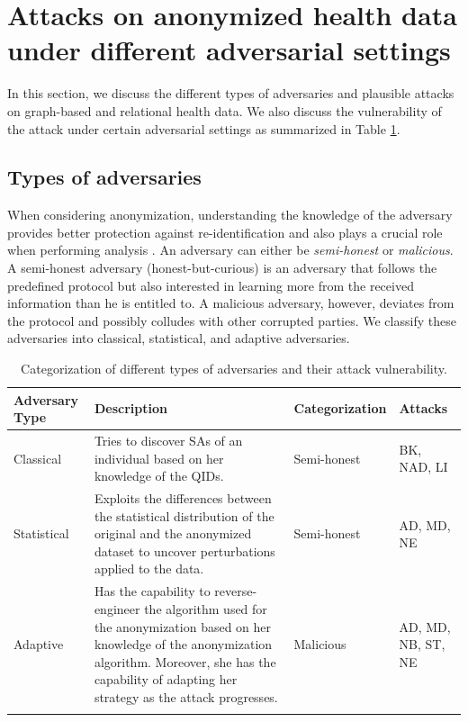\documentclass{bioinfo}
\begin{document}
\section{Attacks on anonymized health data under different adversarial settings}
\label{sec:diffattacks}
In this section, we discuss the different types of adversaries and plausible attacks on graph-based and relational health data. We also discuss the vulnerability of the attack under certain adversarial settings as summarized in Table \ref{advasaryclass}.

\subsection{Types of adversaries}
\label{sec:adversarytype}
When considering anonymization, understanding the knowledge of the adversary provides better protection against re-identification and also plays a crucial role when performing analysis \cite{cite730jandel2014decision}. An adversary can either be \textit{semi-honest} or \textit{malicious}. A semi-honest adversary (honest-but-curious) is an adversary that follows the predefined protocol but also interested in learning more from the received information than he is entitled to. A malicious adversary, however, deviates from the protocol and possibly colludes with other corrupted parties. We classify these adversaries into classical, statistical, and adaptive adversaries.


\begin{table}[h!]
\caption{Categorization of different types of adversaries and their attack vulnerability.}
\label{advasaryclass}
\begin{tabular}{p{1.2cm}p{3.1cm}p{1.7cm}p{1.3cm}}
\toprule
Adversary Type & Description & Categorization & Attacks \\ \toprule
Classical & Tries to discover SAs of an individual based on her knowledge of the QIDs. & Semi-honest & BK, NAD, LI  \\ 
\midrule

Statistical & Exploits the differences between the statistical distribution of the original and the anonymized dataset to uncover perturbations applied to the data. & Semi-honest & AD, MD, NE \\ 
\midrule

Adaptive & Has the capability to reverse-engineer the algorithm used for the anonymization based on her knowledge of the anonymization algorithm. Moreover, she has the capability of adapting her strategy as the attack progresses.& Malicious & AD, MD, NB, ST, NE \\
\botrule

\end{tabular}
\end{table}
\end{document}
